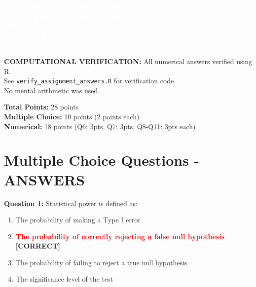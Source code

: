 \documentclass[11pt]{article}
\title{}
\author{}
\date{}
\begin{document}
\begin{tcolorbox}[colback=osaorange,colframe=black,boxrule=2pt,arc=0pt,left=3pt,right=3pt,top=6pt,bottom=6pt,boxsep=2pt]
\centering
\textcolor{white}{\textbf{\Large H524 Introduction to Biostatistics}}\\
\textcolor{white}{\textbf{\Large Week 6: Power, Two-Sample Tests, and ANOVA}}\\
\textcolor{white}{\textbf{\Large Homework Assignment}}\\
\textcolor{white}{\textbf{\Large ANSWER KEY}}\\
\textcolor{white}{\textbf{\Large Fall 2025}}
\end{tcolorbox}

\vspace{8pt}

\begin{tcolorbox}[colback=yellow!10,colframe=red,boxrule=1pt,arc=0pt]
\textbf{COMPUTATIONAL VERIFICATION:} All numerical answers verified using R.\\
See \texttt{verify\_assignment\_answers.R} for verification code.\\
No mental arithmetic was used.
\end{tcolorbox}

\vspace{8pt}

\noindent\textbf{Total Points:} 28 points\\
\textbf{Multiple Choice:} 10 points (2 points each)\\
\textbf{Numerical:} 18 points (Q6: 3pts, Q7: 3pts, Q8-Q11: 3pts each)

\section*{Multiple Choice Questions - ANSWERS}

\textbf{Question 1:} Statistical power is defined as:

\begin{enumerate}[label=\Alph*.]
\item The probability of making a Type I error
\item \textcolor{red}{\textbf{The probability of correctly rejecting a false null hypothesis}} \textbf{[CORRECT]}
\item The probability of failing to reject a true null hypothesis
\item The significance level of the test
\end{enumerate}
\end{document}
